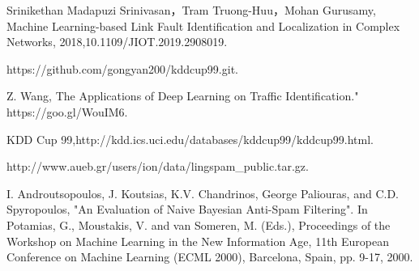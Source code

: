 \documentclass[UTF8]{article}
\begin{document}
\begin{thebibliography}{99}
Srinikethan Madapuzi Srinivasan，Tram Truong-Huu，Mohan Gurusamy, Machine Learning-based Link Fault Identification and Localization in Complex Networks, 2018,10.1109/JIOT.2019.2908019.

https://github.com/gongyan200/kddcup99.git.

 Z. Wang, The Applications of Deep Learning on Traffic Identification." https://goo.gl/WouIM6. 

KDD Cup 99,http://kdd.ics.uci.edu/databases/kddcup99/kddcup99.html.


 http://www.aueb.gr/users/ion/data/lingspam\_public.tar.gz.

I. Androutsopoulos, J. Koutsias, K.V. Chandrinos, George Paliouras,  and C.D. Spyropoulos, "An Evaluation of Naive Bayesian Anti-Spam Filtering". In Potamias, G., Moustakis, V. and van Someren, M. (Eds.), Proceedings of the Workshop on Machine Learning in the New Information Age, 11th  European Conference on Machine Learning (ECML 2000), Barcelona, Spain, pp. 9-17, 2000.


\end{thebibliography}
\end{document}
